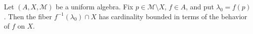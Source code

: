 
Let $(A, X, \mathcal{M})$ be a uniform algebra. Fix $p \in \mathcal{M} \setminus X$, $f \in A$, and put $\lambda_0 = f(p)$. Then the fiber $f^{-1}(\lambda_0) \cap X$ has cardinality bounded in terms of the behavior of $f$ on $X$.
